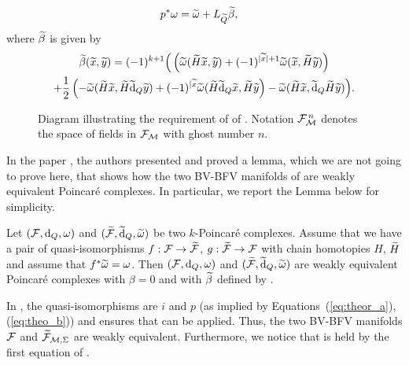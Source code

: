\begin{theorem}
\begin{enumerate}[label={\textup{\alph*)}}]
\begin{align}
            p^* \omega =& \; \widetilde{\omega} + L_{\widetilde{Q}} \widetilde{\beta} ,
        \end{align}
        where $\widetilde{\beta}$ is given by
        \begin{multline}
        \label{eq:beta}
            \widetilde{\beta}(\widetilde{x}, \widetilde{y}) = (-1)^{k+1} \Big( \left(
            \widetilde{\omega} (\widetilde{H} \widetilde{x}, \widetilde{y}) + 
            (-1)^{|\widetilde{x}|+1} \widetilde{\omega} (\widetilde{x}, \widetilde{H} \widetilde{y}) \right) \\
            + \frac{1}{2}\left(-\widetilde{\omega}(\widetilde{H} \widetilde{x}, \widetilde{H} \widetilde{\dd}_Q \widetilde{y}) + 
            (-1)^{|\widetilde{x}} \widetilde{\omega}(\widetilde{H}\widetilde{\dd}_Q \widetilde{x}, \widetilde{H} \widetilde{y} \right) - 
            \widetilde{\omega}(\widetilde{H}\widetilde{x}, \widetilde{\dd}_Q \widetilde{H} \widetilde{y})\Big).
        \end{multline}
    \end{enumerate}
\end{theorem}

\begin{figure}
    \centering
    
    \caption{Diagram illustrating the requirement of  of . Notation $\mathcal{F}_{\mathcal{M}}^{\,n}$ denotes the space of fields in $\mathcal{F}_{\mathcal{M}}$ with ghost number $n$.}
    \label{fig:chain_map_theorem}
\end{figure}

In the paper \cite{Gluing_BV-BFV}, the authors presented and proved a lemma, which we are not going to prove here, that shows how the two BV-BFV manifolds of  are weakly equivalent Poincaré complexes.
In particular, we report the Lemma below for simplicity.

\begin{lemma}
\label{lemma:Poicare}
    Let $(\mathcal{F}, \dd_Q, \omega)$ and $(\widetilde{\mathcal{F}}, \widetilde{\dd}_Q, \widetilde{\omega})$ be two $k$-Poincaré complexes.
    Assume that we have a pair of quasi-isomorphisms $f:\mathcal{F} \rightarrow \widetilde{\mathcal{F}}$, $g:\widetilde{\mathcal{F}} \rightarrow \mathcal{F}$ with chain homotopies $H$, $\widetilde{H}$ and assume that $f^* \widetilde{\omega} = \omega$.
    Then $(\mathcal{F}, \dd_Q, \omega)$ and $(\widetilde{\mathcal{F}}, \widetilde{\dd}_Q, \widetilde{\omega})$ are weakly equivalent Poincaré complexes with $\beta = 0$ and with $\widetilde{\beta}$ defined by .
\end{lemma}

In , the quasi-isomorphisms are $i$ and $p$ (as implied by Equations~(\ref{eq:theor_a}), (\ref{eq:theo_b})) and  ensures that  can be applied.
Thus, the two BV-BFV manifolds $\mathcal{F}$ and $\widetilde{\mathcal{F}}_{\mathcal{M}, \Sigma}$ are weakly equivalent.
Furthermore, we notice that  is held by the first equation of .

